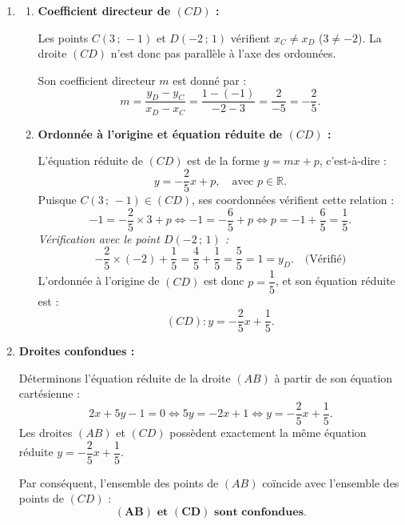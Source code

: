 \documentclass[11pt,a4paper]{article}
\newcommand{\R}{\mathbb{R}}
\begin{document}
\begin{correctionbox}
\begin{enumerate}
    \item 
    \begin{enumerate}
        \item \textbf{Coefficient directeur de $(CD)$ :}
        
        Les points $C(3\,;\,-1)$ et $D(-2\,;\,1)$ vérifient $x_C \neq x_D$ ($3 \neq -2$). La droite $(CD)$ n'est donc pas parallèle à l'axe des ordonnées.
        
        Son coefficient directeur $m$ est donné par :
        \[
        m = \frac{y_D - y_C}{x_D - x_C} = \frac{1 - (-1)}{-2 - 3} = \frac{2}{-5} = -\frac{2}{5}.
        \]

        \item \textbf{Ordonnée à l'origine et équation réduite de $(CD)$ :}
        
        L'équation réduite de $(CD)$ est de la forme $y = mx + p$, c'est-à-dire :
        \[
        y = -\frac{2}{5}x + p, \quad \text{avec } p \in \R.
        \]
        Puisque $C(3\,;\,-1) \in (CD)$, ses coordonnées vérifient cette relation :
        \[
        -1 = -\frac{2}{5} \times 3 + p \iff -1 = -\frac{6}{5} + p \iff p = -1 + \frac{6}{5} = \frac{1}{5}.
        \]
        \textit{Vérification avec le point $D(-2\,;\,1)$ :}
        \[
        -\frac{2}{5} \times (-2) + \frac{1}{5} = \frac{4}{5} + \frac{1}{5} = \frac{5}{5} = 1 = y_D. \quad \text{(Vérifié)}
        \]
        L'ordonnée à l'origine de $(CD)$ est donc $p = \dfrac{1}{5}$, et son équation réduite est :
        \[
        (CD) : y = -\frac{2}{5}x + \frac{1}{5}.
        \]
    \end{enumerate}

    \item \textbf{Droites confondues :}
    
    Déterminons l'équation réduite de la droite $(AB)$ à partir de son équation cartésienne :
    \[
    2x + 5y - 1 = 0 \iff 5y = -2x + 1 \iff y = -\frac{2}{5}x + \frac{1}{5}.
    \]
    Les droites $(AB)$ et $(CD)$ possèdent exactement la même équation réduite $y = -\dfrac{2}{5}x + \dfrac{1}{5}$.
    
    Par conséquent, l'ensemble des points de $(AB)$ coïncide avec l'ensemble des points de $(CD)$ :
    \[
    \mathbf{(AB) \text{ et } (CD) \text{ sont confondues}}.
    \]
\end{enumerate}
\end{correctionbox}

\vspace{0.3cm}

\end{document}
